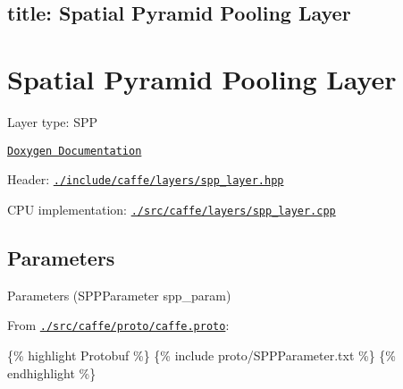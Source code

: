 

 \subsection*{title\+: Spatial Pyramid Pooling Layer }

\section*{Spatial Pyramid Pooling Layer}


\begin{DoxyItemize}
\item Layer type\+: {\ttfamily S\+PP}
\item \href{http://caffe.berkeleyvision.org/doxygen/classcaffe_1_1SPPLayer.html}{\tt Doxygen Documentation}
\item Header\+: \href{https://github.com/BVLC/caffe/blob/master/include/caffe/layers/spp_layer.hpp}{\tt {\ttfamily ./include/caffe/layers/spp\+\_\+layer.hpp}}
\item C\+PU implementation\+: \href{https://github.com/BVLC/caffe/blob/master/src/caffe/layers/spp_layer.cpp}{\tt {\ttfamily ./src/caffe/layers/spp\+\_\+layer.cpp}}
\end{DoxyItemize}

\subsection*{Parameters}


\begin{DoxyItemize}
\item Parameters ({\ttfamily S\+P\+P\+Parameter spp\+\_\+param})
\item From \href{https://github.com/BVLC/caffe/blob/master/src/caffe/proto/caffe.proto}{\tt {\ttfamily ./src/caffe/proto/caffe.proto}}\+:
\end{DoxyItemize}

\{\% highlight Protobuf \%\} \{\% include proto/\+S\+P\+P\+Parameter.\+txt \%\} \{\% endhighlight \%\} 